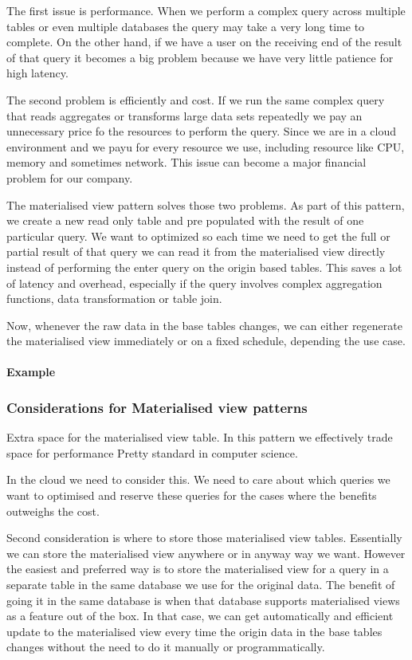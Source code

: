 The first issue is performance.
When we perform a complex query across multiple tables or even multiple databases the query may take a very long time to complete.
On the other hand, if we have a user on the receiving end of the result of that query it becomes a big problem because we have very little patience for high latency.

The second problem is efficiently and cost.
If we run the same complex query that reads aggregates or transforms large data sets repeatedly we pay an unnecessary price fo the resources to perform the query.
Since we are in a cloud environment and we payu for every resource we use, including resource like CPU, memory and sometimes network.
This issue can become a major financial problem for our company.

The materialised view pattern solves those two problems.
As part of this pattern, we create a new read only table and pre populated with the result of one particular query.
We want to optimized so each time we need to get the full or partial result of that query we can read it from the materialised view directly instead of performing the enter query on the origin based tables.
This saves a lot of latency and overhead, especially if the query involves complex aggregation functions, data transformation or table join.

Now, whenever the raw data in the base tables changes, we can either regenerate the materialised view immediately or on a fixed schedule, depending the use case.

\paragraph{Example}

\subsubsection{Considerations for Materialised view patterns}
Extra space for the materialised view table.
In this pattern we effectively trade space for performance
Pretty standard in computer science.

In the cloud we need to consider this.
We need to care about which queries we want to optimised and reserve these queries for the cases where the benefits outweighs the cost.

Second consideration is where to store those materialised view tables.
Essentially we can store the materialised view anywhere or in anyway way we want.
However the easiest and preferred way is to store the materialised view for a query in a separate table in the same database we use for the original data.
The benefit of going it in the same database is when that database supports materialised views as a feature out of the box.
In that case, we can get automatically and efficient update to the materialised view every time the origin data in the base tables changes without the need to do it manually or programmatically.

